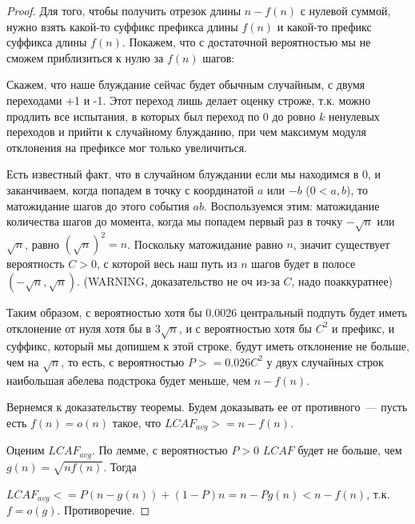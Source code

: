 \begin{proof}
Для того, чтобы получить отрезок длины $n-f(n)$ с нулевой суммой, нужно взять какой-то суффикс префикса длины $f(n)$ и какой-то префикс суффикса длины $f(n)$. Покажем, что с достаточной вероятностью мы не сможем приблизиться к нулю за $f(n)$ шагов:

Скажем, что наше блуждание сейчас будет обычным случайным, с двумя переходами +1 и -1. Этот переход лишь делает оценку строже, т.к. можно продлить все испытания, в которых был переход по 0 до ровно $k$ ненулевых переходов и прийти к случайному блужданию, при чем максимум модуля отклонения на префиксе мог только увеличиться.

Есть известный факт, что в случайном блуждании если мы находимся в 0, и заканчиваем, когда попадем в точку с координатой $a$ или $-b$ ($0 < a, b$), то матожидание шагов до этого события $ab$. Воспользуемся этим: матожидание количества шагов до момента, когда мы попадем первый раз в точку $-\sqrt n$ или $\sqrt n$, равно $(\sqrt n)^2=n$. Поскольку матожидание равно $n$, значит существует вероятность $C>0$, с которой весь наш путь из $n$ шагов будет в полосе $(-\sqrt n, \sqrt n)$. (WARNING, доказательство не оч из-за $C$, надо поаккуратнее)

Таким образом, с вероятностью хотя бы 0.0026 центральный подпуть будет иметь отклонение от нуля хотя бы в $3\sqrt n$, и с вероятностью хотя бы $C^2$ и префикс, и суффикс, который мы допишем к этой строке, будут иметь отклонение не больше, чем на $\sqrt n$, то есть, с вероятностью $P>=0.026C^2$ у двух случайных строк наибольшая абелева подстрока будет меньше, чем $n-f(n)$.

Вернемся к доказательству теоремы. Будем доказывать ее от противного~--- пусть есть $f(n)=o(n)$ такое, что $LCAF_{avg} >= n - f(n)$. 

Оценим $LCAF_{avg}$. По лемме, с вероятностью $P>0$ $LCAF$ будет не больше, чем $g(n)=\sqrt{nf(n)}$. Тогда

$LCAF_{avg} <= P (n-g(n)) + (1-P)n = n-Pg(n) < n - f(n)$, т.к. $f=o(g)$. Противоречие.

\end{proof}

